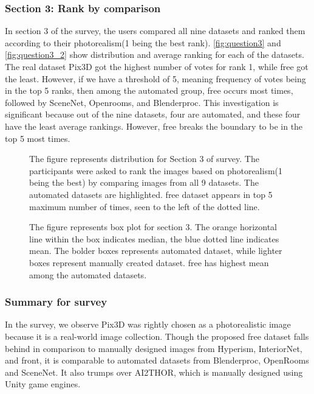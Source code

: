 \subsubsection{Section 3: Rank by comparison}
In section 3 of the survey, the users compared all nine datasets and ranked them according to their photorealism(1 being the best rank).
\autoref{fig:question3} and \autoref{fig:question3_2} show distribution and average ranking for each of the datasets.
The real dataset Pix3D got the highest number of votes for rank 1, while \gls{free} got the least.
However, if we have a threshold of 5, meaning frequency of votes being in the top 5 ranks, then among the automated group, \gls{free} occurs most times, followed by SceneNet, Openrooms, and Blenderproc.
This investigation is significant because out of the nine datasets, four are automated, and these four have the least average rankings.
However, \gls{free} breaks the boundary to be in the top 5 most times.

\begin{figure}
    \centering
    \resizebox{\textwidth}{!}{}
    \caption{The figure represents distribution for Section 3 of survey. The participants were asked to rank the images based on photorealism(1 being the best) by comparing images from all 9 datasets.
    The automated datasets are highlighted. \gls{free} dataset appears in top 5 maximum number of times, seen to the left of the dotted line.}
    \label{fig:question3}
\end{figure}

\begin{figure}
    \centering
    \resizebox{0.75\textwidth}{!}{}
    \caption{The figure represents box plot for section 3. The orange horizontal line within the box indicates median, the blue dotted line indicates mean.
    The bolder boxes represents automated dataset, while lighter boxes represent manually created dataset. \Gls{free} has highest mean among the automated datasets.}
    \label{fig:question3_2}
\end{figure}

\subsubsection{Summary for survey}
In the survey, we observe Pix3D was rightly chosen as a photorealistic image because it is a real-world image collection.
Though the proposed \gls{free} dataset falls behind in comparison to manually designed images from Hyperism, InteriorNet, and \gls{front},
it is comparable to automated datasets from Blenderproc, OpenRooms and SceneNet.
It also trumps over AI2THOR, which is manually designed using Unity game engines.

